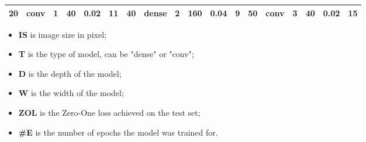\begin{table}
{\begin{tabular}{@{}llllll|llllll|llllll@{}}
20                              & conv                           & 1                              & 40                             & 0.02                             & 11                                & 40                              & dense                          & 2                              & 160                            & 0.04                           & 9                                 & 50                              & conv                           & 3                              & 40                             & 0.02                           & 15                               \\ \bottomrule
\end{tabular}}
\begin{itemize}
    \setlength\itemsep{0pt}
    \item[] \textbf{IS} is image size in pixel;
    \item[] \textbf{T} is the type of model, can be "dense" or "conv";
    \item[] \textbf{D} is the depth of the model;
    \item[] \textbf{W} is the width of the model;
    \item[] \textbf{ZOL} is the Zero-One loss achieved on the test set;
    \item[] \textbf{\#E} is the number of epochs the model was trained for.
\end{itemize}
\end{table}
